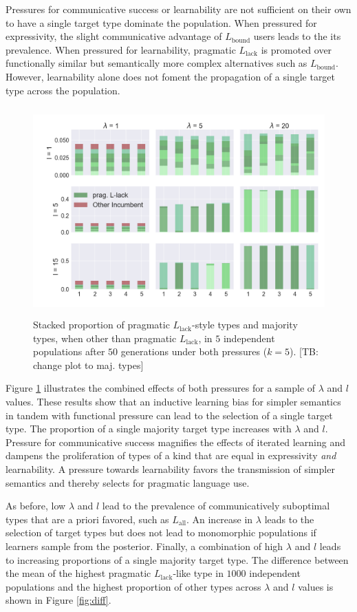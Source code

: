 \documentclass[a4paper, 11pt]{article}
\theoremstyle{Satz}
\newcommand{\tb}[1]{\textcolor[rgb]{.8,.33,.0}{[TB: #1]}}%
\newcommand{\mylang}[1]{\ensuremath{L_{\text{#1}}}\xspace} %
\newcommand{\Lall}{\mylang{all}}
\newcommand{\Lbound}{\mylang{bound}}
\newcommand{\Llack}{\mylang{lack}}
\begin{document}
Pressures for communicative success or learnability are not sufficient on their own to have a
single target type dominate the population. When pressured for expressivity, the slight
communicative advantage of $\Lbound$ users leads to the its prevalence. When pressured for
learnability, pragmatic $\Llack$ is promoted over functionally similar but semantically more
complex alternatives such as $\Lbound$. However, learnability alone does not foment the
propagation of a single target type across the population.

\begin{figure}[t]
\centering
\includegraphics[width=1\textwidth,height=8cm,keepaspectratio]{./plots/fig3-r+m}
\caption{Stacked proportion of pragmatic $\Llack$-style types and majority types, when other than pragmatic $\Llack$, in $5$ independent populations after $50$ generations under both pressures ($k = 5$). \tb{change plot to maj. types}}
\label{fig:rmd}
\end{figure}

Figure \ref{fig:rmd} illustrates the combined effects of both pressures for a sample of
$\lambda$ and $l$ values. These results show that an inductive learning bias for simpler
semantics in tandem with functional pressure can lead to the selection of a single target
type. The proportion of a single majority target type increases with $\lambda$ and
$l$. Pressure for communicative success magnifies the effects of iterated learning and dampens
the proliferation of types of a kind that are equal in expressivity {\em and} learnability. A
pressure towards learnability favors the transmission of simpler semantics and thereby selects
for pragmatic language use.

As before, low $\lambda$ and $l$ lead to the prevalence of communicatively suboptimal types
that are a priori favored, such as $\Lall$. An increase in $\lambda$ leads to the selection of
target types but does not lead to monomorphic populations if learners sample from the
posterior. Finally, a combination of high $\lambda$ and $l$ leads to increasing proportions of
a single majority target type. The difference between the mean of the highest pragmatic
$\Llack$-like type in $1000$ independent populations and the highest proportion of other types
across $\lambda$ and $l$ values is shown in Figure \ref{fig:diff}.
\end{document}
